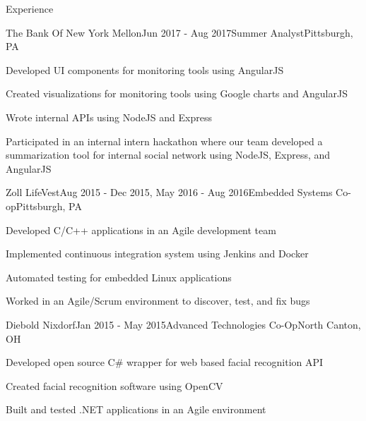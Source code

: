 \documentclass{resume} %
\begin{document}
\begin{rSection}{Experience}

\begin{rSubsection}{The Bank Of New York Mellon}{Jun 2017 - Aug 2017}{Summer Analyst}{Pittsburgh, PA}
\item Developed UI components for monitoring tools using AngularJS
\item Created visualizations for monitoring tools using Google charts and AngularJS
\item Wrote internal APIs using NodeJS and Express 
\item Participated in an internal intern hackathon where our team developed a summarization tool for internal social network using NodeJS, Express, and AngularJS
\end{rSubsection}


\begin{rSubsection}{Zoll LifeVest}{Aug 2015 - Dec 2015, May 2016 - Aug 2016}{Embedded Systems Co-op}{Pittsburgh, PA}
\item Developed C/C++ applications in an Agile development team
\item Implemented continuous integration system using Jenkins and Docker
\item Automated testing for embedded Linux applications
\item Worked in an Agile/Scrum environment to discover, test, and fix bugs
\end{rSubsection}


\begin{rSubsection}{Diebold Nixdorf}{Jan 2015 - May 2015}{Advanced Technologies Co-Op}{North Canton, OH}
\item Developed open source C\# wrapper for web based facial recognition API
\item Created facial recognition software using OpenCV
\item Built and tested .NET applications in an Agile environment
\end{rSubsection}

\end{rSection}

\end{document}
